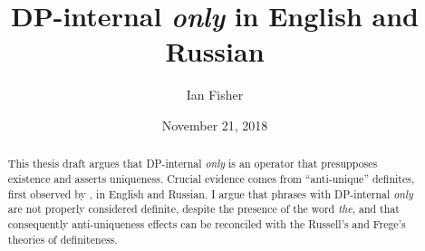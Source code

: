 \documentclass{article}
\title{DP-internal \textit{only} in English and Russian}
\author{Ian Fisher}
\date{November 21, 2018}
\begin{document}
\maketitle

\begin{abstract}
This thesis draft argues that DP-internal \textit{only} is an operator that presupposes existence and asserts uniqueness. Crucial evidence comes from ``anti-unique'' definites, first observed by \citet{cb2012b, cb2015}, in English and Russian. I argue that phrases with DP-internal \textit{only} are not properly considered definite, despite the presence of the word \textit{the}, and that consequently anti-uniqueness effects can be reconciled with the Russell's and Frege's theories of definiteness.
\end{abstract}












\end{document}
